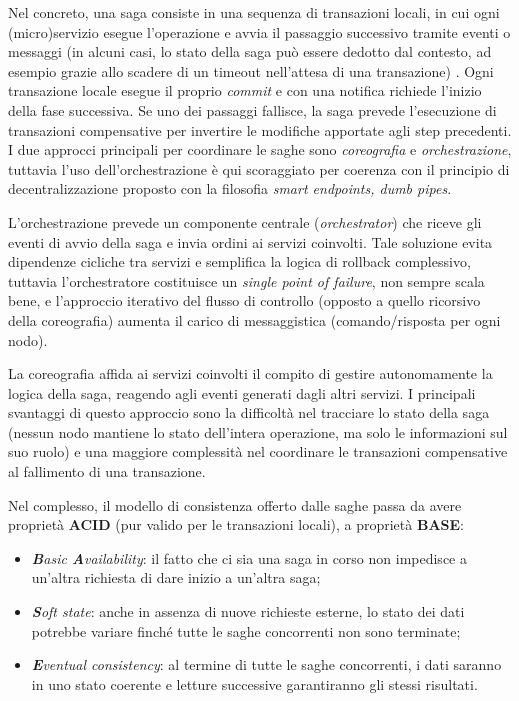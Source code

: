 Nel concreto, una saga consiste in una sequenza di transazioni locali, in cui ogni (micro)servizio esegue l’operazione e avvia il passaggio successivo tramite eventi o messaggi (in alcuni casi, lo stato della saga può essere dedotto dal contesto, ad esempio grazie allo scadere di un timeout nell'attesa di una transazione)  \cite{Microsoft_Saga_Pattern}. Ogni transazione locale esegue il proprio \emph{commit} e con una notifica richiede l'inizio della fase successiva. Se uno dei passaggi fallisce, la saga prevede l'esecuzione di transazioni compensative per invertire le modifiche apportate agli step precedenti.
I due approcci principali per coordinare le saghe sono \emph{coreografia} e \emph{orchestrazione}, tuttavia l'uso dell'orchestrazione è qui scoraggiato per coerenza con il principio di decentralizzazione proposto con la filosofia \emph{smart endpoints, dumb pipes}.

L'orchestrazione prevede un componente centrale (\emph{orchestrator}) che riceve gli eventi di avvio della saga e invia ordini ai servizi coinvolti. Tale soluzione evita dipendenze cicliche tra servizi e semplifica la logica di rollback complessivo, tuttavia l'orchestratore costituisce un \emph{single point of failure}, non sempre scala bene, e l'approccio iterativo del flusso di controllo (opposto a quello ricorsivo della coreografia) aumenta il carico di messaggistica (comando/risposta per ogni nodo).

La coreografia affida ai servizi coinvolti il compito di gestire autonomamente la logica della saga, reagendo agli eventi generati dagli altri servizi. I principali svantaggi di questo approccio sono la difficoltà nel tracciare lo stato della saga (nessun nodo mantiene lo stato dell'intera operazione, ma solo le informazioni sul suo ruolo) e una maggiore complessità nel coordinare le transazioni compensative al fallimento di una transazione.

Nel complesso, il modello di consistenza offerto dalle saghe passa da avere proprietà \textbf{ACID} (pur valido per le transazioni locali), a proprietà \textbf{BASE}:
\begin{itemize}
  \item \emph{\textbf{B}asic \textbf{A}vailability}: il fatto che ci sia una saga in corso non impedisce a un'altra richiesta di dare inizio a un'altra saga;
  \item \emph{\textbf{S}oft state}: anche in assenza di nuove richieste esterne, lo stato dei dati potrebbe variare finché tutte le saghe concorrenti non sono terminate;
  \item \emph{\textbf{E}ventual consistency}: al termine di tutte le saghe concorrenti, i dati saranno in uno stato coerente e letture successive garantiranno gli stessi risultati.
\end{itemize}


